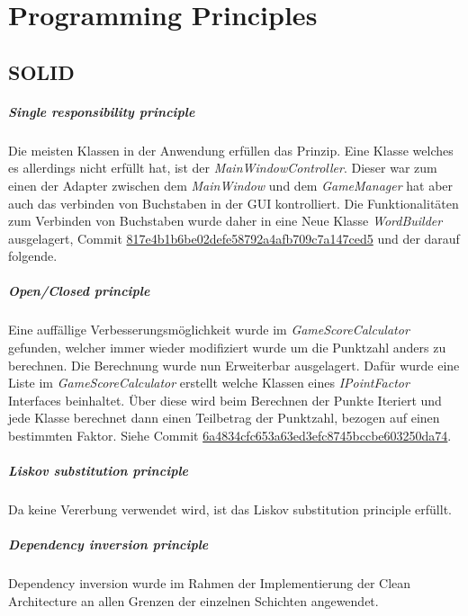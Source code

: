 \chapter{Programming Principles}
\section{SOLID}
\paragraph{Single responsibility principle}
Die meisten Klassen in der Anwendung erfüllen das Prinzip. Eine Klasse welches es allerdings nicht erfüllt hat, ist der \textit{MainWindowController}. Dieser war zum einen der Adapter zwischen dem \textit{MainWindow} und dem \textit{GameManager} hat aber auch das verbinden von Buchstaben in der GUI kontrolliert. Die Funktionalitäten zum Verbinden von Buchstaben wurde daher in eine Neue Klasse \textit{WordBuilder} ausgelagert, Commit \href{https://github.com/EinToni/Wortfinder/commit/817e4b1b6be02defe58792a4afb709c7a147ced5}{817e4b1b6be02defe58792a4afb709c7a147ced5} und der darauf folgende. 


\paragraph{Open/Closed principle}
Eine auffällige Verbesserungsmöglichkeit wurde im \textit{GameScoreCalculator} gefunden, welcher immer wieder modifiziert wurde um die Punktzahl anders zu berechnen. Die Berechnung wurde nun Erweiterbar ausgelagert. Dafür wurde eine Liste im \textit{GameScoreCalculator} erstellt welche Klassen eines \textit{IPointFactor} Interfaces beinhaltet. Über diese wird beim Berechnen der Punkte Iteriert und jede Klasse berechnet dann einen Teilbetrag der Punktzahl, bezogen auf einen bestimmten Faktor. Siehe Commit \href{https://github.com/EinToni/Wortfinder/commit/6a4834cfc653a63ed3efc8745bccbe603250da74}{6a4834cfc653a63ed3efc8745bccbe603250da74}.


\paragraph{Liskov substitution principle}
Da keine Vererbung verwendet wird, ist das Liskov substitution principle erfüllt.

\paragraph{Dependency inversion principle}
Dependency inversion wurde im Rahmen der Implementierung der Clean Architecture an allen Grenzen der einzelnen Schichten angewendet.

